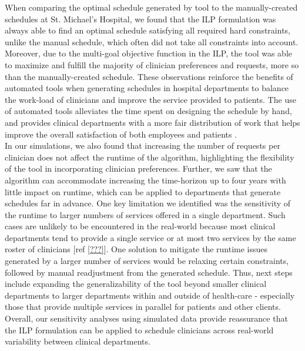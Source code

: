 When comparing the optimal schedule generated by tool to the manually-created schedules at St. Michael's Hospital, we found that the ILP formulation was always able to find an optimal schedule satisfying all required hard constraints, unlike the manual schedule, which often did not take all constraints into account. Moreover, due to the multi-goal objective function in the ILP, the tool was able to maximize and fulfill the majority of clinician preferences and requests, more so than the manually-created schedule. These observations reinforce the benefits of automated tools when generating schedules in hospital departments to balance the work-load of clinicians and improve the service provided to patients. The use of automated tools alleviates the time spent on designing the schedule by hand, and provides clinical departments with a more fair distribution of work that helps improve the overall satisfaction of both employees and patients \cite{silvestro_evaluation_2000}. \\  %

In our simulations, we also found that increasing the number of requests per clinician does not affect the runtime of the algorithm, highlighting the flexibility of the tool in incorporating clinician preferences. Further, we saw that the algorithm can accommodate increasing the time-horizon up to four years with little impact on runtime, which can be applied to departments that generate schedules far in advance. One key limitation we identified was the sensitivity of the runtime to larger numbers of services offered in a single department. Such cases are unlikely to be encountered in the real-world because most clinical departments tend to provide a single service or at most two services by the same roster of clinicians [ref \ref{???}]. One solution to mitigate the runtime issues generated by a larger number of services would be relaxing certain constraints, followed by manual readjustment from the generated schedule. %
Thus, next steps include expanding the generalizability of the tool beyond smaller clinical departments to larger departments within and outside of health-care - especially those that provide multiple services in parallel for patients and other clients. Overall, our sensitivity analyses using simulated data provide reassurance that the ILP formulation can be applied to schedule clinicians across real-world variability between clinical departments. %